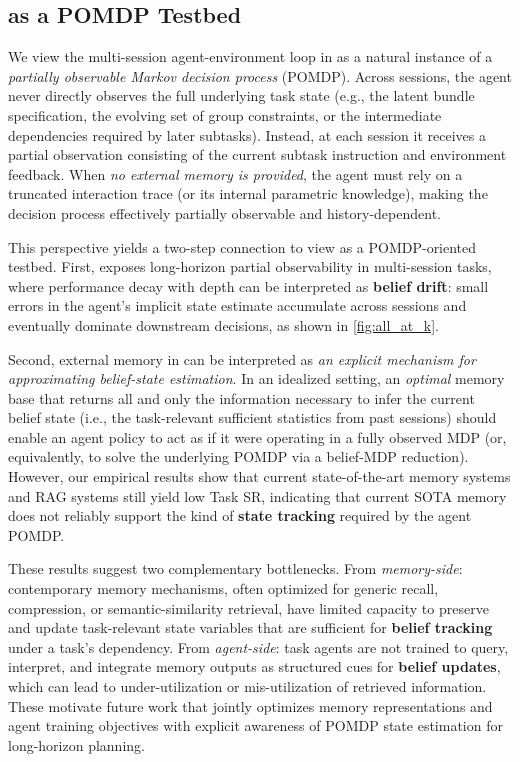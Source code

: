 \subsection{\ours as a POMDP Testbed}
\label{sec:pomdp_link}

We view the multi-session agent-environment loop in \ours as a natural instance of a \emph{partially observable Markov decision process} (POMDP). Across sessions, the agent never directly observes the full underlying task state (e.g., the latent bundle specification, the evolving set of group constraints, or the intermediate dependencies required by later subtasks). Instead, at each session it receives a partial observation consisting of the current subtask instruction and environment feedback. When \textit{no external memory is provided}, the agent must rely on a truncated interaction trace (or its internal parametric knowledge), making the decision process effectively partially observable and history-dependent.

This perspective yields a two-step connection to view \ours as a POMDP-oriented testbed. First, \ours exposes long-horizon partial observability in multi-session tasks, where performance decay with depth can be interpreted as \textbf{belief drift}: small errors in the agent’s implicit state estimate accumulate across sessions and eventually dominate downstream decisions, as shown in \cref{fig:all_at_k}.

Second, external memory in \ours can be interpreted as \textit{an explicit mechanism for approximating belief-state estimation}. In an idealized setting, an \emph{optimal} memory base that returns all and only the information necessary to infer the current belief state (i.e., the task-relevant sufficient statistics from past sessions) should enable an agent policy to act as if it were operating in a fully observed MDP (or, equivalently, to solve the underlying POMDP via a belief-MDP reduction). However, our empirical results show that current state-of-the-art memory systems and RAG systems still yield low Task SR, indicating that current SOTA memory does not reliably support the kind of \textbf{state tracking} required by the agent POMDP.

These results suggest two complementary bottlenecks. From \emph{memory-side}: contemporary memory mechanisms, often optimized for generic recall, compression, or semantic-similarity retrieval, have limited capacity to preserve and update task-relevant state variables that are sufficient for \textbf{belief tracking} under a task’s dependency. From \emph{agent-side}: task agents are not trained to query, interpret, and integrate memory outputs as structured cues for \textbf{belief updates}, which can lead to under-utilization or mis-utilization of retrieved information. These motivate future work that jointly optimizes memory representations and agent training objectives with explicit awareness of POMDP state estimation for long-horizon planning.





